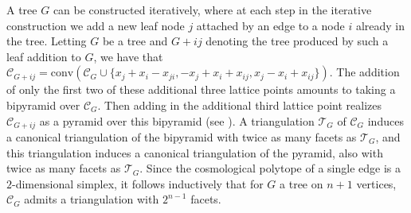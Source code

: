\begin{rema}
    A tree $G$ can be constructed iteratively, where at each step in the iterative construction we add a new leaf node $j$ attached by an edge to a node $i$ already in the tree. Letting $G$ be a tree and $G + ij$ denoting the tree produced by such a leaf addition to $G$, we have that $\mathcal{C}_{G + ij} = \textrm{conv}(\mathcal{C}_G \cup \{x_j + x_i - x_{ji},-x_j + x_i + x_{ij}, x_j - x_i + x_{ij}\})$. The addition of only the first two of these additional three lattice points amounts to taking a bipyramid over $\mathcal{C}_G$.  Then adding in the additional third lattice point realizes $\mathcal{C}_{G +ij}$ as a pyramid over this bipyramid (see \cite[Proposition 4.1]{kuhne2022faces}). 
    A triangulation $\mathcal{T}_G$ of $\mathcal{C}_G$ induces a canonical triangulation of the bipyramid with twice as many facets as $\mathcal{T}_G$, and this triangulation induces a canonical triangulation of the pyramid, also with twice as many facets as $\mathcal{T}_G$. 
    Since the cosmological polytope of a single edge is a $2$-dimensional simplex, it follows inductively that for $G$ a tree on $n+1$ vertices, $\mathcal{C}_G$ admits a triangulation with $2^{n-1}$ facets. 
\end{rema}


